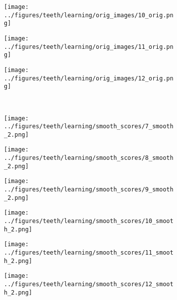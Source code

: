 \begin{figure}[h!]
	\begin{subfigure}{0.15\textwidth}
		\centering
		\texttt{[image: ../figures/teeth/learning/orig\_images/10\_orig.png]}
		\label{fig:1}
	\end{subfigure}
	\begin{subfigure}{0.15\textwidth}
		\centering
		\texttt{[image: ../figures/teeth/learning/orig\_images/11\_orig.png]}
		\label{fig:1}
	\end{subfigure}
	\begin{subfigure}{0.15\textwidth}
		\centering
		\texttt{[image: ../figures/teeth/learning/orig\_images/12\_orig.png]}
		\label{fig:1}
	\end{subfigure}
	\vspace{-0.35cm}
	\\
	\begin{subfigure}[b]{0.03\textwidth} %
		\centering
	\end{subfigure}
	\begin{subfigure}{0.15\textwidth}
		\centering
		\texttt{[image: ../figures/teeth/learning/smooth\_scores/7\_smooth\_2.png]}
		\label{fig:1}
	\end{subfigure}
	\begin{subfigure}{0.15\textwidth}
		\centering
		\texttt{[image: ../figures/teeth/learning/smooth\_scores/8\_smooth\_2.png]}
		\label{fig:1}
	\end{subfigure}
	\begin{subfigure}{0.15\textwidth}
		\centering
		\texttt{[image: ../figures/teeth/learning/smooth\_scores/9\_smooth\_2.png]}
		\label{fig:1}
	\end{subfigure}
	\begin{subfigure}{0.15\textwidth}
		\centering
		\texttt{[image: ../figures/teeth/learning/smooth\_scores/10\_smooth\_2.png]}
		\label{fig:1}
	\end{subfigure}
	\begin{subfigure}{0.15\textwidth}
		\centering
		\texttt{[image: ../figures/teeth/learning/smooth\_scores/11\_smooth\_2.png]}
		\label{fig:1}
	\end{subfigure}
	\begin{subfigure}{0.15\textwidth}
		\centering
		\texttt{[image: ../figures/teeth/learning/smooth\_scores/12\_smooth\_2.png]}
		\label{fig:1}
	\end{subfigure}

\end{figure}
